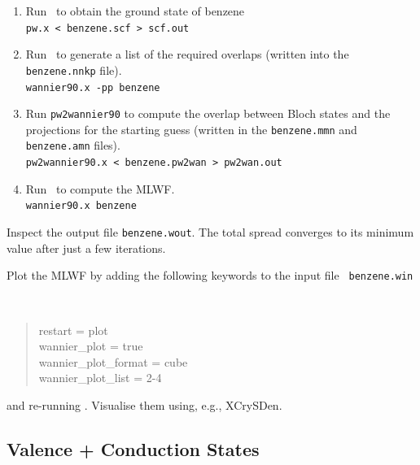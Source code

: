 \documentclass[a4paper,11pt,twoside]{article}
\begin{document}
\begin{enumerate}
\item Run \pwscf\ to obtain the ground state of benzene\\
{\tt pw.x < benzene.scf > scf.out}

\item Run \wannier\ to generate a list of the required overlaps (written
  into the {\tt benzene.nnkp} file).\\
{\tt wannier90.x -pp benzene}

\item Run {\tt pw2wannier90} to compute the overlap between Bloch
  states and the projections for the starting guess (written in the
  {\tt benzene.mmn} and {\tt  benzene.amn} files).\\
{\tt pw2wannier90.x < benzene.pw2wan > pw2wan.out}

\item Run \wannier\ to compute the MLWF.\\
{\tt wannier90.x benzene}

\end{enumerate}

Inspect the output file {\tt benzene.wout}. The total spread converges
to its minimum value after just a few iterations. 

Plot the MLWF by adding the following keywords to the input file {\tt
  benzene.win} 
{\tt
\begin{quote}
restart               = plot\\
wannier\_plot         = true\\
wannier\_plot\_format = cube\\
wannier\_plot\_list   = 2-4
\end{quote} }
and re-running \wannier. Visualise them using, e.g., XCrySDen. 

\subsection*{Valence + Conduction States}
\end{document}
